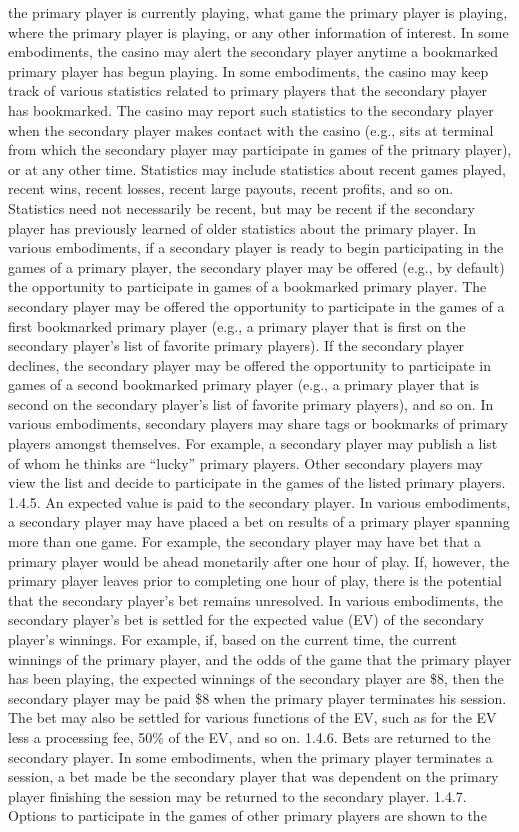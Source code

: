 \documentclass[11pt,a4paper]{article}
\begin{document}
the primary player is currently playing, what game the primary player is playing, where the primary player is playing, or any other information of interest. In some embodiments, the casino may alert the secondary player anytime a bookmarked primary player has begun playing. In some embodiments, the casino may keep track of various statistics related to primary players that the secondary player has bookmarked. The casino may report such statistics to the secondary player when the secondary player makes contact with the casino (e.g., sits at terminal from which the secondary player may participate in games of the primary player), or at any other time. Statistics may include statistics about recent games played, recent wins, recent losses, recent large payouts, recent profits, and so on. Statistics need not necessarily be recent, but may be recent if the secondary player has previously learned of older statistics about the primary player. In various embodiments, if a secondary player is ready to begin participating in the games of a primary player, the secondary player may be offered (e.g., by default) the opportunity to participate in games of a bookmarked primary player. The secondary player may be offered the opportunity to participate in the games of a first bookmarked primary player (e.g., a primary player that is first on the secondary player's list of favorite primary players). If the secondary player declines, the secondary player may be offered the opportunity to participate in games of a second bookmarked primary player (e.g., a primary player that is second on the secondary player's list of favorite primary players), and so on. In various embodiments, secondary players may share tags or bookmarks of primary players amongst themselves. For example, a secondary player may publish a list of whom he thinks are “lucky” primary players. Other secondary players may view the list and decide to participate in the games of the listed primary players. 1.4.5. An expected value is paid to the secondary player. In various embodiments, a secondary player may have placed a bet on results of a primary player spanning more than one game. For example, the secondary player may have bet that a primary player would be ahead monetarily after one hour of play. If, however, the primary player leaves prior to completing one hour of play, there is the potential that the secondary player's bet remains unresolved. In various embodiments, the secondary player's bet is settled for the expected value (EV) of the secondary player's winnings. For example, if, based on the current time, the current winnings of the primary player, and the odds of the game that the primary player has been playing, the expected winnings of the secondary player are \$8, then the secondary player may be paid \$8 when the primary player terminates his session. The bet may also be settled for various functions of the EV, such as for the EV less a processing fee, 50\% of the EV, and so on. 1.4.6. Bets are returned to the secondary player. In some embodiments, when the primary player terminates a session, a bet made be the secondary player that was dependent on the primary player finishing the session may be returned to the secondary player. 1.4.7. Options to participate in the games of other primary players are shown to the 
\end{document}

